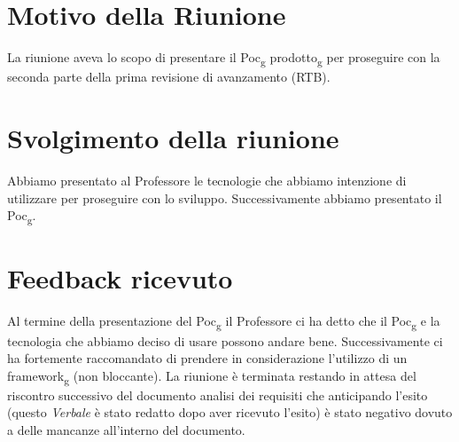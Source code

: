 \section{Motivo della Riunione}
La riunione aveva lo scopo di presentare il Poc\textsubscript{g} prodotto\textsubscript{g} per proseguire con la seconda parte della prima revisione di avanzamento (RTB).
\section{Svolgimento della riunione}
Abbiamo presentato al Professore le tecnologie che abbiamo intenzione di utilizzare per proseguire con lo sviluppo.
Successivamente abbiamo presentato il Poc\textsubscript{g}.
\section{Feedback ricevuto}
Al termine della presentazione del Poc\textsubscript{g} il Professore ci ha detto che il Poc\textsubscript{g} e la tecnologia che abbiamo deciso di usare possono andare bene.
Successivamente ci ha fortemente raccomandato di prendere in considerazione l'utilizzo di un framework\textsubscript{g} (non bloccante).
La riunione è terminata restando in attesa del riscontro successivo del documento analisi dei requisiti che anticipando
l'esito (questo \textit{Verbale} è stato redatto dopo aver ricevuto l'esito) è stato negativo dovuto 
a delle mancanze all'interno del documento.